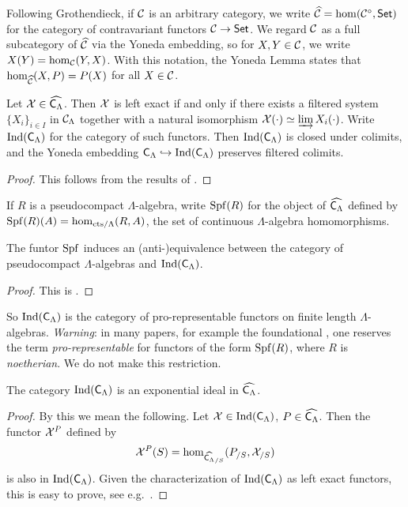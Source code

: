 \documentclass[phd,cornellheadings,draft]{cornell}
\begin{document}
Following Grothendieck, if $\mathcal{C}$ is an arbitrary category, we write 
$\widehat{\mathcal{C}}=\hom(\mathcal{C}^\circ,\mathsf{Set})$ for the category of contravariant functors 
$\mathcal{C}\to \mathsf{Set}$. We regard $\mathcal{C}$ as a full subcategory of $\widehat{\mathcal{C}}$ via the 
Yoneda embedding, so for $X,Y\in \mathcal{C}$, we write $X(Y) = \hom_{\mathcal{C}}(Y,X)$. With 
this notation, the Yoneda Lemma states that $\hom_{\widehat{\mathcal{C}}}(X,P) = P(X)$ 
for all $X\in \mathcal{C}$. 

\begin{lemma}\label{thm:ind-object-def}
Let $\mathcal{X}\in\widehat{\mathsf{C}_\Lambda}$. Then $\mathcal{X}$ is left exact if and only 
if there exists a filtered system $\{X_i\}_{i\in I}$ in $\mathcal{C}_\Lambda$ together 
with a natural isomorphism $\mathcal{X}(\cdot)\simeq \varinjlim X_i(\cdot)$. Write 
$\operatorname{Ind}(\mathsf{C}_\Lambda)$ for the category of such functors. Then 
$\operatorname{Ind}(\mathsf{C}_\Lambda)$ is closed under colimits, and the 
Yoneda embedding $\mathsf{C}_\Lambda\hookrightarrow\operatorname{Ind}(\mathsf{C}_\Lambda)$ 
preserves filtered colimits.
\end{lemma}
\begin{proof}
This follows from the results of \cite[6.1]{kashiwara-schapira-2006}. 
\end{proof}

If $R$ is a pseudocompact $\Lambda$-algebra, write $\operatorname{Spf}(R)$ for the object of 
$\widehat{\mathsf{C}_\Lambda}$ defined by $\operatorname{Spf}(R)(A)=\hom_{\mathrm{cts}/\Lambda}(R,A)$, 
the set of continuous $\Lambda$-algebra homomorphisms. 

\begin{lemma}
The funtor $\operatorname{Spf}$ induces an (anti-)equivalence between the category of 
pseudocompact $\Lambda$-algebras and $\operatorname{Ind}(\mathsf{C}_\Lambda)$. 
\end{lemma}
\begin{proof}
This is \cite[VII\textsubscript{B} 0.4.2 Prop.]{sga3-1}. 
\end{proof}

So $\operatorname{Ind}(\mathsf{C}_\Lambda)$ is the category of pro-representable 
functors on finite length $\Lambda$-algebras. \emph{Warning}: in many papers, 
for example the foundational \cite{mazur-1995}, one reserves the term 
\emph{pro-representable} for functors of the form $\operatorname{Spf}(R)$, where $R$ is 
\emph{noetherian}. We do not make this restriction. 

\begin{lemma}\label{thm:exponential-ideal}
The category $\operatorname{Ind}(\mathsf{C}_\Lambda)$ is an exponential ideal in 
$\widehat{\mathsf{C}_\Lambda}$. 
\end{lemma}
\begin{proof}
By this we mean the following. Let $\mathcal{X}\in \operatorname{Ind}(\mathsf{C}_\Lambda)$, 
$P\in \widehat{\mathsf{C}_\Lambda}$. Then the functor $\mathcal{X}^P$ defined by 
\[
	\mathcal{X}^P(S) = \hom_{\widehat{\mathsf{C}_\Lambda}_{/S}}(P_{/S},\mathcal{X}_{/S}) 
\]
is also in $\operatorname{Ind}(\mathsf{C}_\Lambda)$. Given the characterization of 
$\operatorname{Ind}(\mathsf{C}_\Lambda)$ as left exact functors, this is easy to 
prove, see e.g.~\cite[4.2.3]{johnstone-2002}. 
\end{proof}
\end{document}

